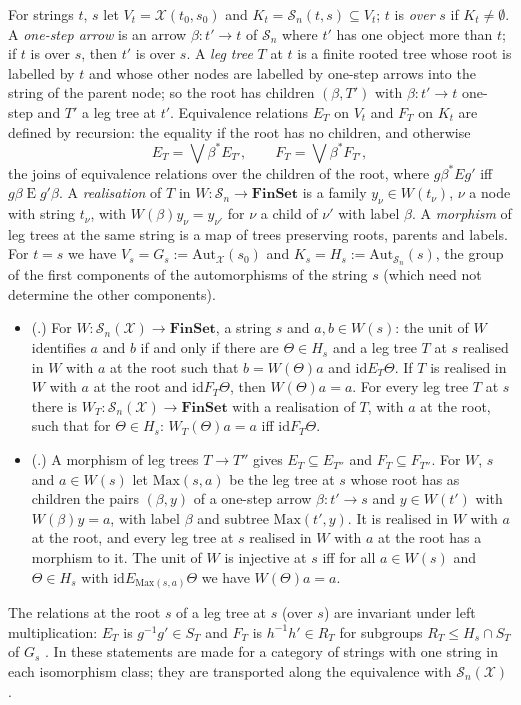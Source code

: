 \documentclass[11pt]{amsart}
\theoremstyle{definition}
\newcommand{\Fin}{\mathbf{FinSet}}
\newcommand{\Aut}{\mathrm{Aut}}
\newcommand{\Max}{\mathrm{Max}}
\newcommand{\cX}{\mathcal X}
\newcommand{\cS}{\mathcal S}
\newcommand{\id}{\mathrm{id}}
\begin{document}
For strings $t$, $s$ let $V_t=\cX(t_0,s_0)$ and $K_t=\cS_n(t,s)
\subseteq V_t$; $t$ is \emph{over} $s$ if $K_t\ne\emptyset$. A
\emph{one-step arrow} is an arrow $\beta\colon t'\to t$ of $\cS_n$
where $t'$ has one object more than $t$; if $t$ is over $s$, then $t'$
is over $s$. A \emph{leg tree} $T$ at $t$ \cite[Def.~6.14]{Strings} is
a finite rooted tree whose root is labelled by $t$ and whose other
nodes are labelled by one-step arrows into the string of the parent
node; so the root has children $(\beta,T')$ with $\beta\colon t'\to t$
one-step and $T'$ a leg tree at $t'$. Equivalence relations $E_T$ on
$V_t$ and $F_T$ on $K_t$ are defined by recursion: the equality if the
root has no children, and otherwise
\[
E_T=\bigvee\beta^*E_{T'},\qquad F_T=\bigvee\beta^*F_{T'},
\]
the joins of equivalence relations over the children of the root,
where $g\mathrel{\beta^*E}g'$ iff $g\beta\mathrel Eg'\beta$. A
\emph{realisation} of $T$ in $W\colon\cS_n\to\Fin$ is a family
$y_\nu\in W(t_\nu)$, $\nu$ a node with string $t_\nu$, with
$W(\beta)y_\nu=y_{\nu'}$ for $\nu$ a child of $\nu'$ with label
$\beta$. A \emph{morphism} of leg trees at the same string is a map of
trees preserving roots, parents and labels. For $t=s$ we have
$V_s=G_s:=\Aut_\cX(s_0)$ and $K_s=H_s:=\Aut_{\cS_n}(s)$, the group of
the first components of the automorphisms of the string $s$ (which
need not determine the other components).

\begin{itemize}
\item[(R10)] (\cite[proof of Thm.~6.15]{Strings}.) For $W\colon
\cS_n(\cX)\to\Fin$, a string $s$ and $a,b\in W(s)$: the unit of $W$
identifies $a$ and $b$ if and only if there are $\Theta\in H_s$ and a
leg tree $T$ at $s$ realised in $W$ with $a$ at the root such that
$b=W(\Theta)a$ and $\id\mathrel{E_T}\Theta$. If $T$ is realised in $W$
with $a$ at the root and $\id\mathrel{F_T}\Theta$, then
$W(\Theta)a=a$. For every leg tree $T$ at $s$ there is $W_T\colon
\cS_n(\cX)\to\Fin$ with a realisation of $T$, with $a$ at the root,
such that for $\Theta\in H_s$: $W_T(\Theta)a=a$ iff
$\id\mathrel{F_T}\Theta$.
\item[(R11)] (\cite[Lemma~8.1(a),(c)]{Proftrees}.) A morphism of leg
trees $T\to T''$ gives $E_T\subseteq E_{T''}$ and $F_T\subseteq
F_{T''}$. For $W$, $s$ and $a\in W(s)$ let $\Max(s,a)$ be the leg tree
at $s$ whose root has as children the pairs $(\beta,y)$ of a one-step
arrow $\beta\colon t'\to s$ and $y\in W(t')$ with $W(\beta)y=a$, with
label $\beta$ and subtree $\Max(t',y)$. It is realised in $W$ with $a$
at the root, and every leg tree at $s$ realised in $W$ with $a$ at the
root has a morphism to it. The unit of $W$ is injective at $s$ iff for
all $a\in W(s)$ and $\Theta\in H_s$ with $\id\mathrel{E_{\Max(s,a)}}
\Theta$ we have $W(\Theta)a=a$.
\end{itemize}
The relations at the root $s$ of a leg tree at $s$ (over $s$) are
invariant under left multiplication: $E_T$ is $g^{-1}g'\in S_T$ and
$F_T$ is $h^{-1}h'\in R_T$ for subgroups $R_T\le H_s\cap S_T$ of $G_s$
\cite[\S6]{Strings}. In \cite{Strings} these statements are made for a
category of strings with one string in each isomorphism class; they
are transported along the equivalence with $\cS_n(\cX)$.
\end{document}
